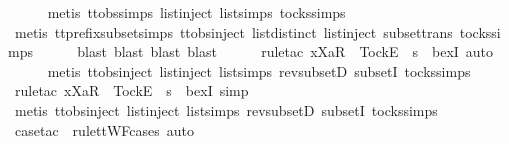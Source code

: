 \ \ \ \ \isamarkupfalse%
\ {\isacharparenleft}metis\ ttobs{\isachardot}simps{\isacharparenleft}{}{\isacharparenright}\ list{\isachardot}inject\ list{\isachardot}simps{\isacharparenleft}{}{\isacharparenright}\ tocks{\isachardot}simps{\isacharparenright}\isanewline
\ \ \ \ \isamarkupfalse%
\ {\isacharparenleft}metis\ tt{\isacharunderscore}prefix{\isacharunderscore}subset{\isachardot}simps{\isacharparenleft}{}{\isacharparenright}\ ttobs{\isachardot}inject{\isacharparenleft}{}{\isacharparenright}\ list{\isachardot}distinct{\isacharparenleft}{}{\isacharparenright}\ list{\isachardot}inject\ subset{\isacharunderscore}trans\ tocks{\isachardot}simps{\isacharparenright}\isanewline
\ \ \ \ \isamarkupfalse%
\ {\isacharparenleft}blast{\isacharcomma}\ blast{\isacharcomma}\ blast{\isacharcomma}\ blast{\isacharparenright}\isanewline
\ \ \ \ \isamarkupfalse%
\ {\isacharparenleft}rule{\isacharunderscore}tac\ x{\isacharequal}{\isachardoublequoteopen}{\isacharbrackleft}Xa{\isacharbrackright}\isactrlsub R\ {\isacharhash}\ {\isacharbrackleft}Tock{\isacharbrackright}\isactrlsub E\ {\isacharhash}\ s{\isacharprime}{\isachardoublequoteclose}\ \ bexI{\isacharcomma}\ auto{\isacharparenright}\isanewline
\ \ \ \ \isamarkupfalse%
\ {\isacharparenleft}metis\ ttobs{\isachardot}inject{\isacharparenleft}{}{\isacharparenright}\ list{\isachardot}inject\ list{\isachardot}simps{\isacharparenleft}{}{\isacharparenright}\ rev{\isacharunderscore}subsetD\ subsetI\ tocks{\isachardot}simps{\isacharparenright}\isanewline
\ \ \ \ \isamarkupfalse%
\ {\isacharparenleft}rule{\isacharunderscore}tac\ x{\isacharequal}{\isachardoublequoteopen}{\isacharbrackleft}Xa{\isacharbrackright}\isactrlsub R\ {\isacharhash}\ {\isacharbrackleft}Tock{\isacharbrackright}\isactrlsub E\ {\isacharhash}\ s{\isacharprime}{\isachardoublequoteclose}\ \ bexI{\isacharcomma}\ simp{\isacharparenright}\isanewline
\ \ \ \ \isamarkupfalse%
\ {\isacharparenleft}metis\ ttobs{\isachardot}inject{\isacharparenleft}{}{\isacharparenright}\ list{\isachardot}inject\ list{\isachardot}simps{\isacharparenleft}{}{\isacharparenright}\ rev{\isacharunderscore}subsetD\ subsetI\ tocks{\isachardot}simps{\isacharparenright}\isanewline
\ \ \ \ \isamarkupfalse%
\ {\isacharparenleft}case{\isacharunderscore}tac\ {\isasymsigma}\ rule{\isacharcolon}ttWF{\isachardot}cases{\isacharcomma}\ auto{\isacharparenright}{\isacharplus}\isanewline
